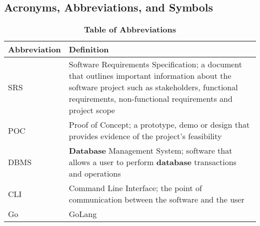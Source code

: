 \documentclass[12pt, titlepage]{article}
\begin{document}
\subsection{Acronyms, Abbreviations, and Symbols}
	
\begin{table}[H]
\caption{\textbf{Table of Abbreviations}} \label{Table}

\begin{tabularx}{\textwidth}{p{3cm}X}
\toprule
\textbf{Abbreviation} & \textbf{Definition} \\
\midrule
SRS & Software Requirements Specification; a document that outlines important information about the software project such as stakeholders, functional requirements, non-functional requirements and project scope \\
POC & Proof of Concept; a prototype, demo or design that provides evidence of the project's feasibility \\
DBMS & \textbf{Database} Management System; software that allows a user to perform \textbf{database} transactions and operations\\
CLI & Command Line Interface; the point of communication between the software and the user \\
Go & GoLang \\
\bottomrule
\end{tabularx}

\end{table}
\end{document}
